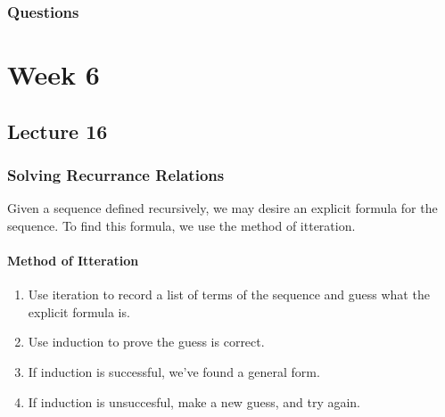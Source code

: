 \documentclass{report}
\begin{document}
\subsection*{Questions}
\qs{}{}

\chapter{Week 6}
\section{Lecture 16}
\subsection*{Solving Recurrance Relations}
Given a sequence defined recursively, we may desire an explicit formula for the sequence. To find this formula, we use the method of itteration.
\subsubsection*{Method of Itteration}
\begin{enumerate}
	\item Use iteration to record a list of terms of the sequence and guess what the explicit formula is.
	\item Use induction to prove the guess is correct.
	\item If induction is successful, we've found a general form.
	\item If induction is unsuccesful, make a new guess, and try again.
\end{enumerate}

\end{document}
